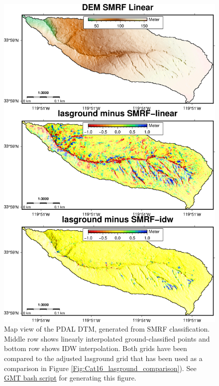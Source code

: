 \documentclass[a4paperpaper,,tablecaptionabove]{scrartcl}
\begin{document}
\begin{figure}
\centering
\includegraphics[width=\textwidth,height=0.9\textheight]{./tex2pdf.-e6884bf2dada0f3b/c1820159b77b07d3eb329d9de1686abfd1d6f527.png}
\caption{Map view of the PDAL DTM, generated from SMRF classification.
Middle row shows linearly interpolated ground-classified points and
bottom row shows IDW interpolation. Both grids have been compared to the
adjusted lasground grid that has been used as a comparison in Figure
\ref{Fig:Cat16_lasground_comparison}). See
\href{https://github.com/BodoBookhagen/PC_geomorph_roughness/blob/master/example_01/example01_create_DEM_PDAL_comparison_ground_classification_gmt.sh}{GMT
bash script} for generating this figure.
\label{Fig:Cat16_lasground_PDAL_diff}}
\end{figure}
\end{document}
